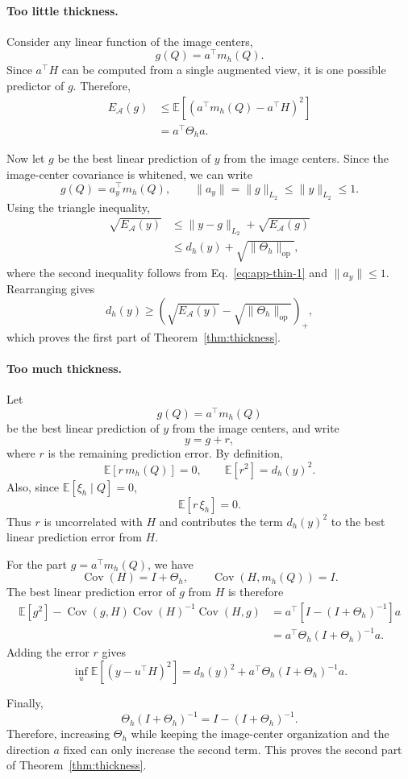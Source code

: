 \documentclass{article} %
\theoremstyle{remark}
\begin{document}
\paragraph{Too little thickness.}
Consider any linear function of the image centers,
\[
g(Q)=a^\top m_h(Q).
\]
Since $a^\top H$ can be computed from a single augmented view, it is one possible predictor of $g$. Therefore,
\begin{align}
E_{\mathcal A}(g)
&\leq
\mathbb{E}\!\left[
    \left(a^\top m_h(Q)-a^\top H\right)^2
\right] \\
&=
a^\top \Theta_h a.
\label{eq:app-thin-1}
\end{align}

Now let $g$ be the best linear prediction of $y$ from the image centers. Since the image-center covariance is whitened, we can write
\[
g(Q)=a_y^\top m_h(Q),
\qquad
\|a_y\|=\|g\|_{L_2}\leq \|y\|_{L_2}\leq 1.
\]
Using the triangle inequality,
\begin{align}
\sqrt{E_{\mathcal A}(y)}
&\leq
\|y-g\|_{L_2}
+
\sqrt{E_{\mathcal A}(g)} \\
&\leq
d_h(y)
+
\sqrt{\|\Theta_h\|_{\mathrm{op}}},
\end{align}
where the second inequality follows from
Eq.~\eqref{eq:app-thin-1} and $\|a_y\|\leq1$.
Rearranging gives
\[
d_h(y)
\geq
\left(
\sqrt{E_{\mathcal A}(y)}
-
\sqrt{\|\Theta_h\|_{\mathrm{op}}}
\right)_+,
\]
which proves the first part of Theorem~\ref{thm:thickness}.

\paragraph{Too much thickness.}
Let
\[
g(Q)=a^\top m_h(Q)
\]
be the best linear prediction of $y$ from the image centers, and write
\[
y=g+r,
\]
where $r$ is the remaining prediction error. By definition,
\[
\mathbb{E}[r\,m_h(Q)]=0,
\qquad
\mathbb{E}[r^2]=d_h(y)^2.
\]
Also, since $\mathbb{E}[\xi_h\mid Q]=0$,
\[
\mathbb{E}[r\,\xi_h]=0.
\]
Thus $r$ is uncorrelated with $H$ and contributes the term $d_h(y)^2$ to the best linear prediction error from $H$.

For the part $g=a^\top m_h(Q)$, we have
\[
\operatorname{Cov}(H)=I+\Theta_h,
\qquad
\operatorname{Cov}(H,m_h(Q))=I.
\]
The best linear prediction error of $g$ from $H$ is therefore
\begin{align}
\mathbb{E}[g^2]
-
\operatorname{Cov}(g,H)
\operatorname{Cov}(H)^{-1}
\operatorname{Cov}(H,g)
&=
a^\top
\left[I-(I+\Theta_h)^{-1}\right]
a \\
&=
a^\top
\Theta_h(I+\Theta_h)^{-1}
a.
\end{align}
Adding the error $r$ gives
\[
\inf_u
\mathbb{E}\!\left[(y-u^\top H)^2\right]
=
d_h(y)^2
+
a^\top
\Theta_h(I+\Theta_h)^{-1}
a.
\]

Finally,
\[
\Theta_h(I+\Theta_h)^{-1}
=
I-(I+\Theta_h)^{-1}.
\]
Therefore, increasing $\Theta_h$ while keeping the image-center organization and the direction $a$ fixed can only increase the second term. This proves the second part of Theorem~\ref{thm:thickness}.
\end{document}
